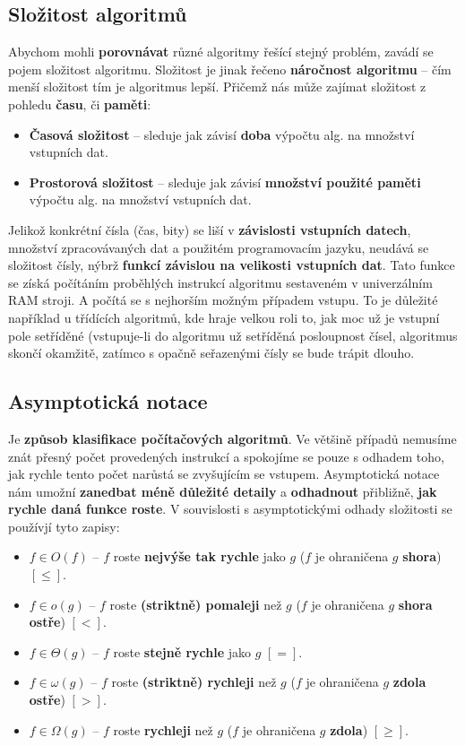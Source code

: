\subsection{Složitost algoritmů}
Abychom mohli \textbf{porovnávat} různé algoritmy řešící stejný problém, zavádí se pojem složitost algoritmu. Složitost je jinak řečeno \textbf{náročnost algoritmu} -- čím menší složitost tím je algoritmus lepší.
Přičemž nás může zajímat složitost z pohledu \textbf{času}, či \textbf{paměti}:
\begin{itemize}
\item \textbf{Časová složitost} -- sleduje jak závisí \textbf{doba} výpočtu alg. na množství vstupních dat.
\item \textbf{Prostorová složitost} -- sleduje jak závisí \textbf{množství použité paměti} výpočtu alg. na množství vstupních dat.
\end{itemize}
Jelikož konkrétní čísla (čas, bity) se liší v \textbf{závislosti vstupních datech}, množství zpracovávaných dat a použitém programovacím jazyku, neudává se složitost čísly, nýbrž \textbf{funkcí závislou na velikosti vstupních dat}. Tato funkce se získá počítáním proběhlých instrukcí algoritmu sestaveném v univerzálním RAM stroji. A počítá se s nejhorším možným případem vstupu. To je důležité například u třídících algoritmů, kde hraje velkou roli to, jak moc už je vstupní pole setříděné (vstupuje-li do algoritmu už setříděná posloupnost čísel, algoritmus skončí okamžitě, zatímco s opačně seřazenými čísly se bude trápit dlouho.

\subsection{Asymptotická notace}
Je \textbf{způsob klasifikace počítačových algoritmů}. Ve většině případů nemusíme znát přesný počet provedených instrukcí a spokojíme se pouze s odhadem toho, jak rychle tento počet narůstá se zvyšujícím se vstupem. Asymptotická notace nám umožní \textbf{zanedbat méně důležité detaily} a \textbf{odhadnout} přibližně, \textbf{jak rychle daná funkce roste}.
 V souvislosti s asymptotickými odhady složitosti se používjí tyto zapisy:
\begin{itemize}
	\item $f \in O(f)$ -- $f$ roste \textbf{nejvýše tak rychle} jako $g$ ($f$ je ohraničena $g$ \textbf{shora}) $[\leq]$.
	\item $f \in o(g)$ -- $f$ roste \textbf{(striktně) pomaleji} než $g$ ($f$ je ohraničena $g$ \textbf{shora ostře}) $[<]$.
	\item $f \in \Theta (g)$ -- $f$ roste \textbf{stejně rychle} jako $g$ $[=]$.
	\item $f \in \omega(g)$ -- $f$ roste \textbf{(striktně) rychleji} než $g$ ($f$ je ohraničena $g$ \textbf{zdola ostře}) $[>]$.
	\item $f \in \Omega(g)$ -- $f$ roste \textbf{rychleji} než $g$ ($f$ je ohraničena $g$ \textbf{zdola}) $[\geq]$.
\end{itemize}

